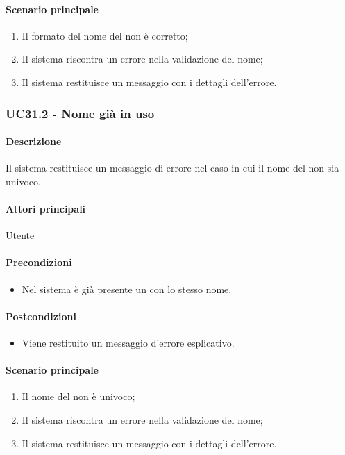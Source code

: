 \paragraph*{Scenario principale}
\begin{enumerate}
  \item Il formato del nome del  non è corretto;
  \item Il sistema riscontra un errore nella validazione del nome;
  \item Il sistema restituisce un messaggio con i dettagli dell'errore.  
\end{enumerate}


\subsubsection{UC31.2 - Nome già in uso}\label{UC31point2}
\paragraph*{Descrizione}
Il sistema restituisce un messaggio di errore nel caso in cui il nome del  non sia univoco.

\paragraph*{Attori principali}
Utente

\paragraph*{Precondizioni}
\begin{itemize}
  \item Nel sistema è già presente un  con lo stesso nome.
\end{itemize}

\paragraph*{Postcondizioni}
\begin{itemize}
  \item Viene restituito un messaggio d'errore esplicativo.
\end{itemize}

\paragraph*{Scenario principale}
\begin{enumerate}
  \item Il nome del  non è univoco;
  \item Il sistema riscontra un errore nella validazione del nome;
  \item Il sistema restituisce un messaggio con i dettagli dell'errore.  
\end{enumerate}
